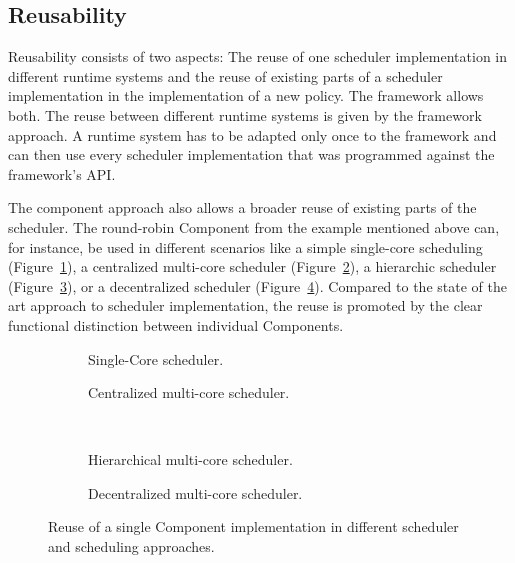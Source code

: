 \subsection{Reusability}%
\label{sec:arch:reusability}

Reusability consists of two aspects: The reuse of one scheduler implementation in different runtime systems and the reuse of existing parts of a scheduler implementation in the implementation of a new policy. The \cobas{} framework allows both. The reuse between different runtime systems is given by the framework approach. A runtime system has to be adapted only once to the framework and can then use every scheduler implementation that was programmed against the framework's \ac{API}.

The component approach also allows a broader reuse of existing parts of the scheduler. The round-robin Component from the example mentioned above can, for instance, be used in different scenarios like a simple single-core scheduling (Figure~\ref{fig:arch:reuse:single}), a centralized multi-core scheduler (Figure~\ref{fig:arch:reuse:central}), a hierarchic scheduler (Figure~\ref{fig:arch:reuse:hierarchy}), or a decentralized scheduler (Figure~\ref{fig:arch:reuse:decentral}). Compared to the state of the art approach to scheduler implementation, the reuse is promoted by the clear functional distinction between individual Components.

\begin{figure}[t!]\centering \hfill
	\begin{subfigure}[b]{0.48\linewidth}\centering
		 \vspace{0.1cm}
		\caption{Single-Core scheduler.}%
		\label{fig:arch:reuse:single}
	\end{subfigure} \hfill
	\begin{subfigure}[b]{0.48\linewidth}\centering
		 \vspace{0.1cm}
		\caption{Centralized multi-core scheduler.}%
		\label{fig:arch:reuse:central}
	\end{subfigure} \hfill \\ \vspace{1mm} \hfill
	\begin{subfigure}[b]{0.48\linewidth}\centering
		 \vspace{0.7cm}
		\caption{Hierarchical multi-core scheduler.}%
		\label{fig:arch:reuse:hierarchy}
	\end{subfigure} \hfill
	\begin{subfigure}[b]{0.48\linewidth}\centering
		\caption{Decentralized multi-core scheduler.}%
		\label{fig:arch:reuse:decentral}
	\end{subfigure} \hfill

	\caption[Reuse of a Component implementation.]{Reuse of a single Component implementation in different scheduler and scheduling approaches.}%
	\label{fig:arch:reuse}
\end{figure}

